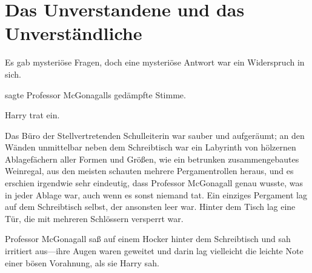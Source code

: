 \chapter{Das Unverstandene und das Unverständliche}

\begin{chapterOpeningQuote}
Es gab mysteriöse Fragen, doch eine mysteriöse Antwort war ein Widerspruch in sich.
\end{chapterOpeningQuote}

 sagte Professor McGonagalls gedämpfte Stimme.

\hplettrineextrapara
Harry trat ein.

Das Büro der Stellvertretenden Schulleiterin war sauber und aufgeräumt; an den Wänden unmittelbar neben dem Schreibtisch war ein Labyrinth von hölzernen Ablagefächern aller Formen und Größen, wie ein betrunken zusammengebautes Weinregal, aus den meisten schauten mehrere Pergamentrollen heraus, und es erschien irgendwie sehr eindeutig, dass Professor McGonagall genau wusste, was in jeder Ablage war, auch wenn es sonst niemand tat. Ein einziges Pergament lag auf dem Schreibtisch selbst, der ansonsten leer war. Hinter dem Tisch lag eine Tür, die mit mehreren Schlössern versperrt war.

Professor McGonagall saß auf einem Hocker hinter dem Schreibtisch und sah irritiert aus—ihre Augen waren geweitet und darin lag vielleicht die leichte Note einer bösen Vorahnung, als sie Harry sah.

